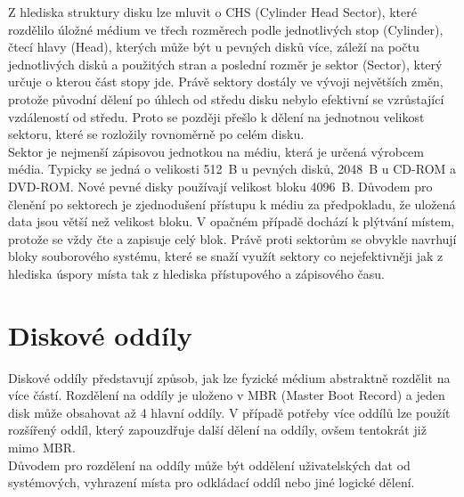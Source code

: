 Z hlediska struktury disku lze mluvit o CHS (Cylinder Head Sector), které rozdělilo úložné médium ve třech rozměrech podle jednotlivých stop (Cylinder), čtecí hlavy (Head), kterých může být u pevných disků více, záleží na počtu jednotlivých disků a použitých stran a poslední rozměr je sektor (Sector), který určuje o kterou část stopy jde. Právě sektory dostály ve vývoji největších změn, protože původní dělení po úhlech od středu disku nebylo efektivní se vzrůstající vzdáleností od středu. Proto se později přešlo k dělení na jednotnou velikost sektoru, které se rozložily rovnoměrně po celém disku.\\
Sektor je nejmenší zápisovou jednotkou na médiu, která je určená výrobcem média. Typicky se jedná o velikosti 512~B u pevných disků, 2048~B u CD-ROM a DVD-ROM. Nové pevné disky používají velikost bloku 4096~B. Důvodem pro členění po sektorech je zjednodušení přístupu k médiu za předpokladu, že uložená data jsou větší než velikost bloku. V opačném případě dochází k plýtvání místem, protože se vždy čte a zapisuje celý blok. Právě proti sektorům se obvykle navrhují bloky souborového systému, které se snaží využít sektory co nejefektivněji jak z hlediska úspory místa tak z hlediska přístupového a zápisového času.

\section{Diskové oddíly}
Diskové oddíly představují způsob, jak lze fyzické médium abstraktně rozdělit na více částí. Rozdělení na oddíly je uloženo v MBR (Master Boot Record) a jeden disk může obsahovat až 4 hlavní oddíly. V případě potřeby více oddílů lze použít rozšířený oddíl, který zapouzdřuje další dělení na oddíly, ovšem tentokrát již mimo MBR.\\
Důvodem pro rozdělení na oddíly může být oddělení uživatelských dat od systémových, vyhrazení místa pro odkládací oddíl nebo jiné logické dělení. 

